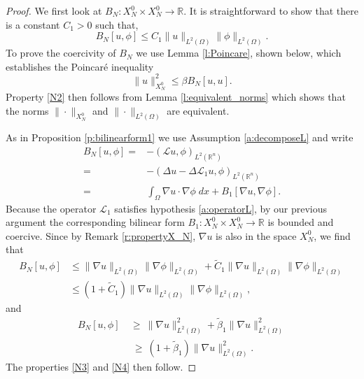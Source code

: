 \documentclass[11pt]{amsart}   	%
\theoremstyle{plain}
\numberwithin{equation}{section}
\def\R{\mathbb{R}}
\begin{document}
\begin{proof}
 We first look at $B_N: X^0_N \times X^0_N \longrightarrow \R$.
It is straightforward to show that there is a constant $C_1>0$ such that,
\[ B_N[u,\phi] \leq C_1 \| u\|_{L^2(\Omega)} \| \phi\|_{L^2(\Omega)}.\]
To prove the coercivity of $B_N$ we use Lemma \ref{l:Poincare}, shown below, which establishes the Poincar{\'e} inequality
\[ \|u\|^2_{X^0_N} \leq \beta B_N[u,u].\]
Property \ref{N2} then follows from Lemma \ref{l:equivalent_norms} which shows that the norms $\| \cdot\|_{X^0_N}$ and $\| \cdot\|_{L^2(\Omega)}$ are equivalent.

As in Proposition \ref{p:bilinearform1} we use Assumption \ref{a:decomposeL} and write
\begin{equation}\label{Eq: DecomposeL1_2}
\begin{aligned}
B_N[u,\phi] = & - (\mathcal{L}u, \phi)_{L^2(\R^n)}\\
= & - (\Delta u - \Delta \mathcal{L}_1u, \phi)_{L^2(\R^n)}\\
= &   \int_{\Omega} \nabla u \cdot \nabla \phi \;dx + B_1[ \nabla u , \nabla \phi ]. 
\end{aligned}
\end{equation}
Because the operator $\mathcal{L}_1$ satisfies hypothesis \ref{a:operatorL}, by our previous argument the corresponding bilinear form $B_1: X^0_N \times X^0_N \longrightarrow \R$ is bounded and coercive. Since by Remark \ref{r:propertyX_N},  $\nabla u$ is also in the  space $X^0_N$, we find that
 \begin{equation*}
\begin{aligned}
B_N[u,\phi] & \leq  \| \nabla u\|_{L^2(\Omega)}  \| \nabla \phi \|_{L^2(\Omega)}  + \tilde{C}_1 \| \nabla u\|_{L^2(\Omega)}  \| \nabla \phi \|_{L^2(\Omega)} \\
& \leq  (1+ \tilde{C}_1)   \| \nabla u\|_{L^2(\Omega)}  \| \nabla \phi \|_{L^2(\Omega)},
\end{aligned}
\end{equation*}
and
\begin{equation*}
\begin{aligned}
B_N[u,\phi] \ & \geq \ \| \nabla u\|^2_{L^2(\Omega)} + \tilde{\beta}_1 \| \nabla u\|^2_{L^2(\Omega)}  \\
& \ \geq \ (1+ \tilde{\beta}_1)   \| \nabla u\|^2_{L^2(\Omega)}.
\end{aligned}
\end{equation*}
The properties \ref{N3} and \ref{N4} then follow.
\end{proof}
\end{document}

